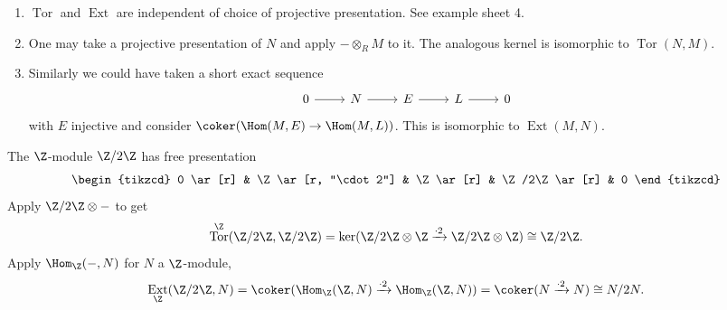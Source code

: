 \documentclass[a4paper]{article}
\DeclareMathOperator{\Tor}{Tor}
\DeclareMathOperator{\Ext}{Ext}
\begin{document}
\begin{remark}\leavevmode
  \begin{enumerate}
  \item \(\Tor\) and \(\Ext\) are independent of choice of projective presentation. See example sheet 4.
  \item One may take a projective presentation of \(N\) and apply \(- \otimes_R M\) to it. The analogous kernel is isomorphic to \(\Tor(N, M)\).
  \item Similarly we could have taken a short exact sequence
    \[
      \begin{tikzcd}
        0 \ar[r] & N \ar[r] & E \ar[r] & L \ar[r] & 0
      \end{tikzcd}
    \]
    with \(E\) injective and consider \(\coker(\Hom(M, E) \to \Hom(M, L))\). This is isomorphic to \(\Ext(M, N)\).
  \end{enumerate}
\end{remark}

\begin{eg}
  The \(\Z\)-module \(\Z/2\Z\) has free presentation
  \[
    \begin{tikzcd}
      0 \ar[r] & \Z \ar[r, "\cdot 2"] & \Z \ar[r] & \Z/2\Z \ar[r] & 0
    \end{tikzcd}
  \]
  Apply \(\Z/2\Z \otimes -\) to get
  \[
    \Tor^\Z(\Z/2\Z, \Z/2\Z) = \ker(\Z/2\Z \otimes \Z \xrightarrow{\cdot 2} \Z/2\Z \otimes \Z) \cong \Z/2\Z.
  \]
  Apply \(\Hom_\Z(-, N)\) for \(N\) a \(\Z\)-module,
  \[
    \Ext_\Z(\Z/2\Z, N) = \coker(\Hom_\Z(\Z, N) \xrightarrow{\cdot 2} \Hom_\Z(\Z, N)) = \coker(N \xrightarrow{\cdot 2} N) \cong N/2N.
  \]
\end{eg}
\end{document}
